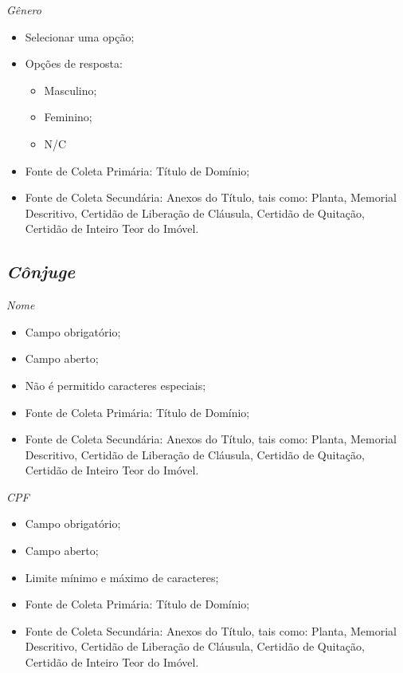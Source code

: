 \documentclass[
  letterpaper,
]{report}
\providecommand{\tightlist}{%
  \setlength{\itemsep}{0pt}\setlength{\parskip}{0pt}}\usepackage{longtable,booktabs,array}
\begin{document}
\emph{Gênero}

\begin{itemize}
\tightlist
\item
  Selecionar uma opção;
\item
  Opções de resposta:

  \begin{itemize}
  \tightlist
  \item
    Masculino;
  \item
    Feminino;
  \item
    N/C
  \end{itemize}
\item
  Fonte de Coleta Primária: Título de Domínio;
\item
  Fonte de Coleta Secundária: Anexos do Título, tais como: Planta,
  Memorial Descritivo, Certidão de Liberação de Cláusula, Certidão de
  Quitação, Certidão de Inteiro Teor do Imóvel.
\end{itemize}

\hypertarget{cuxf4njuge}{%
\subsection{\texorpdfstring{\emph{Cônjuge}}{Cônjuge}}\label{cuxf4njuge}}

\emph{Nome}

\begin{itemize}
\tightlist
\item
  Campo obrigatório;
\item
  Campo aberto;
\item
  Não é permitido caracteres especiais;
\item
  Fonte de Coleta Primária: Título de Domínio;
\item
  Fonte de Coleta Secundária: Anexos do Título, tais como: Planta,
  Memorial Descritivo, Certidão de Liberação de Cláusula, Certidão de
  Quitação, Certidão de Inteiro Teor do Imóvel.
\end{itemize}

\emph{CPF}

\begin{itemize}
\tightlist
\item
  Campo obrigatório;
\item
  Campo aberto;
\item
  Limite mínimo e máximo de caracteres;
\item
  Fonte de Coleta Primária: Título de Domínio;
\item
  Fonte de Coleta Secundária: Anexos do Título, tais como: Planta,
  Memorial Descritivo, Certidão de Liberação de Cláusula, Certidão de
  Quitação, Certidão de Inteiro Teor do Imóvel.
\end{itemize}
\end{document}
